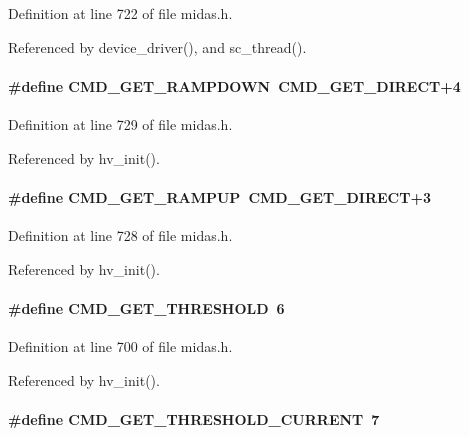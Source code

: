 Definition at line 722 of file midas.h.

Referenced by device\_\-driver(), and sc\_\-thread().
\paragraph[{CMD\_\-GET\_\-RAMPDOWN}]{\setlength{\rightskip}{0pt plus 5cm}\#define CMD\_\-GET\_\-RAMPDOWN~CMD\_\-GET\_\-DIRECT+4}\hfill\label{group__err26_ga44aa2c303f8f03a0b6f7ed9adeb6c58f}


Definition at line 729 of file midas.h.

Referenced by hv\_\-init().
\paragraph[{CMD\_\-GET\_\-RAMPUP}]{\setlength{\rightskip}{0pt plus 5cm}\#define CMD\_\-GET\_\-RAMPUP~CMD\_\-GET\_\-DIRECT+3}\hfill\label{group__err26_gaf7240072ae61d012e70aca676ab00492}


Definition at line 728 of file midas.h.

Referenced by hv\_\-init().
\paragraph[{CMD\_\-GET\_\-THRESHOLD}]{\setlength{\rightskip}{0pt plus 5cm}\#define CMD\_\-GET\_\-THRESHOLD~6}\hfill\label{group__err26_gafa1449391aaad6d2e8b58ac5a151ab45}


Definition at line 700 of file midas.h.

Referenced by hv\_\-init().
\paragraph[{CMD\_\-GET\_\-THRESHOLD\_\-CURRENT}]{\setlength{\rightskip}{0pt plus 5cm}\#define CMD\_\-GET\_\-THRESHOLD\_\-CURRENT~7}\hfill\label{group__err26_gaf447cadf8b96a84e466e576c4248588f}


